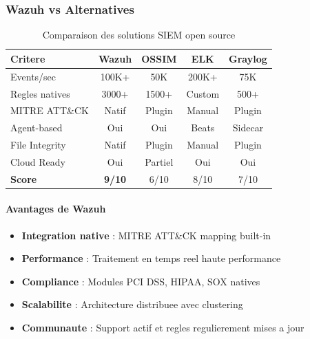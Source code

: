 \subsubsection{Wazuh vs Alternatives}

\begin{table}[H]
    \centering
    \caption{Comparaison des solutions SIEM open source}
    \begin{tabular}{|l|c|c|c|c|}
        \hline
        \textbf{Critere} & \textbf{Wazuh} & \textbf{OSSIM} & \textbf{ELK} & \textbf{Graylog} \\
        \hline
        Events/sec       & 100K+          & 50K            & 200K+        & 75K              \\
        \hline
        Regles natives   & 3000+          & 1500+          & Custom       & 500+             \\
        \hline
        MITRE ATT\&CK    & Natif          & Plugin         & Manual       & Plugin           \\
        \hline
        Agent-based      & Oui            & Oui            & Beats        & Sidecar          \\
        \hline
        File Integrity   & Natif          & Plugin         & Manual       & Plugin           \\
        \hline
        Cloud Ready      & Oui            & Partiel        & Oui          & Oui              \\
        \hline
        \textbf{Score}   & \textbf{9/10}  & 6/10           & 8/10         & 7/10             \\
        \hline
    \end{tabular}
\end{table}

\paragraph{Avantages de Wazuh}
\begin{itemize}
    \item \textbf{Integration native} : MITRE ATT\&CK mapping built-in
    \item \textbf{Performance} : Traitement en temps reel haute performance
    \item \textbf{Compliance} : Modules PCI DSS, HIPAA, SOX natives
    \item \textbf{Scalabilite} : Architecture distribuee avec clustering
    \item \textbf{Communaute} : Support actif et regles regulierement mises a jour
\end{itemize}

